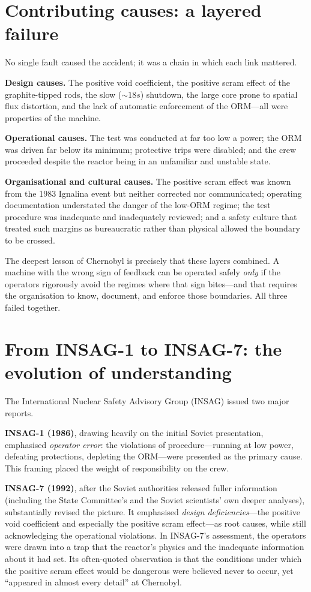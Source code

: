\section{Contributing causes: a layered failure}

No single fault caused the accident; it was a chain in which each link mattered.

\textbf{Design causes.} The positive void coefficient, the positive scram effect
of the graphite-tipped rods, the slow ($\sim 18\unit{s}$) shutdown, the large core
prone to spatial flux distortion, and the lack of automatic enforcement of the
ORM---all were properties of the machine.

\textbf{Operational causes.} The test was conducted at far too low a power; the
ORM was driven far below its minimum; protective trips were disabled; and the crew
proceeded despite the reactor being in an unfamiliar and unstable state.

\textbf{Organisational and cultural causes.} The positive scram effect was known
from the 1983 Ignalina event but neither corrected nor communicated; operating
documentation understated the danger of the low-ORM regime; the test procedure was
inadequate and inadequately reviewed; and a safety culture that treated such
margins as bureaucratic rather than physical allowed the boundary to be crossed.

The deepest lesson of Chernobyl is precisely that these layers combined. A machine
with the wrong sign of feedback can be operated safely \emph{only} if the
operators rigorously avoid the regimes where that sign bites---and that requires
the organisation to know, document, and enforce those boundaries. All three failed
together.

\section{From INSAG-1 to INSAG-7: the evolution of understanding}

The International Nuclear Safety Advisory Group (INSAG) issued two major reports.

\textbf{INSAG-1 (1986)}, drawing heavily on the initial Soviet presentation,
emphasised \emph{operator error}: the violations of procedure---running at low
power, defeating protections, depleting the ORM---were presented as the primary
cause. This framing placed the weight of responsibility on the crew.

\textbf{INSAG-7 (1992)}, after the Soviet authorities released fuller information
(including the State Committee's and the Soviet scientists' own deeper analyses),
substantially revised the picture. It emphasised \emph{design deficiencies}---the
positive void coefficient and especially the positive scram effect---as root
causes, while still acknowledging the operational violations. In INSAG-7's
assessment, the operators were drawn into a trap that the reactor's physics and the
inadequate information about it had set. Its often-quoted observation is that the
conditions under which the positive scram effect would be dangerous were believed
never to occur, yet ``appeared in almost every detail'' at Chernobyl.


